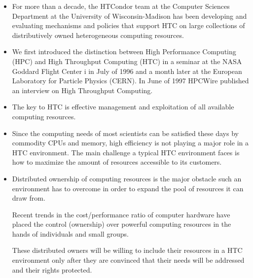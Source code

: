 \begin{itemize}
\item For more than a decade, the HTCondor team at the Computer Sciences Department at the University of Wisconsin-Madison has been 
developing and evaluating mechanisms and policies that support HTC on large collections of distributively owned heterogeneous 
computing resources. 

\item We first introduced the distinction between High Performance Computing (HPC) and High Throughput Computing 
(HTC) in a seminar at the NASA Goddard Flight Center i in July of 1996 and a month later at the European Laboratory for 
Particle Physics (CERN). In June of 1997 HPCWire published an interview on High Throughput Computing.

\item
The key to HTC is effective management and exploitation of all available computing resources. 

\item
Since the computing needs of most scientists can be satisfied these days by commodity CPUs and memory, high efficiency is 
not playing a major role in a HTC environment. The main challenge a typical HTC environment faces is how to maximize the 
amount of resources accessible to its customers. 

\item
Distributed ownership of computing resources is the major obstacle such 
an environment has to overcome in order to expand the pool of resources it can draw from. 

Recent trends in the cost/performance  ratio of computer hardware have placed the control (ownership) over powerful 
computing resources in the hands of individuals and small groups. 

These distributed owners will be willing to include their resources in a HTC
environment only after they are convinced that their needs will be addressed and their rights protected.
\end{itemize}


